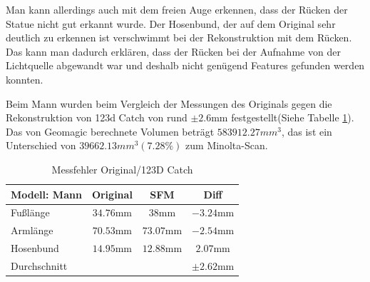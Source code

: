 \documentclass[]{article}
\begin{document}
Man kann allerdings auch mit dem freien Auge erkennen, dass der Rücken der Statue nicht gut erkannt wurde. Der Hosenbund, der auf dem Original sehr deutlich zu erkennen ist verschwimmt bei der Rekonstruktion mit dem Rücken. Das kann man dadurch erklären, dass der Rücken bei der Aufnahme von der Lichtquelle abgewandt war und deshalb nicht genügend Features gefunden werden konnten.

Beim Mann wurden beim Vergleich der Messungen des Originals gegen die Rekonstruktion von 123d Catch von rund $\pm 2.6$mm festgestellt(Siehe Tabelle \ref{tab:man:errorSFM}). Das von Geomagic berechnete Volumen beträgt $583912.27mm^3$, das ist ein Unterschied von $39662.13mm^3(7.28\%)$ zum Minolta-Scan.

\begin{table}[h!]
\centering
\begin{tabular}{l | c c | c}
Modell: Mann& Original & SFM & Diff\\
\hline
Fußlänge & $34.76$mm & $38$mm & $-3.24$mm\\
Armlänge & $70.53$mm & $73.07$mm & $-2.54$mm\\
Hosenbund & $14.95$mm & $12.88$mm & $2.07$mm\\
\hline \hline
Durchschnitt & & & $\pm 2.62$mm
\end{tabular}
\caption{Messfehler Original/123D Catch}
\label{tab:man:errorSFM}
\end{table}
\end{document}

